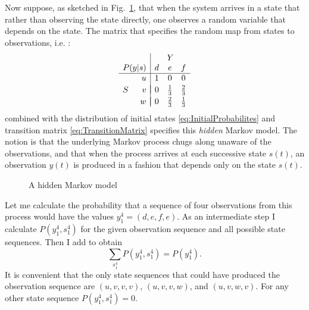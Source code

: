 \documentclass[]{article}
\newcommand{\ts}[3]{#1_{#2}^{#3}}                    %
\newcommand{\ti}[2]{{#1}{(#2)}}                  %
\newcommand{\ie}{i.e.\xspace}
\newcommand{\plotsize}{%
  \fontsize{9}{9}%
  \selectfont}
\renewcommand{\comment}[1]{}
\begin{document}
%
Now suppose, as sketched in Fig.~\ref{fig:dhmm}, that when the system
arrives in a state that rather than observing the state directly, one
observes a random variable that depends on the state.  The matrix that
specifies the random map from states to observations, \ie%
:
\begin{equation*}
  \begin{array}{cr|ccc}
      &      &\multicolumn{3}{c}{Y} \\
      \multicolumn{2}{r|}{P(y|s)} & d & e           & f \\ %
      \hline%
      & u      & 1 & 0           & 0 \\
      &        & \vspace{-1 em} \\
    S & v      & 0 & \frac{1}{3} & \frac{2}{3} \\
      &        & \vspace{-1 em} \\
      & w      & 0 & \frac{2}{3} & \frac{1}{3}
  \end{array}%
\end{equation*}
combined with the distribution of initial states
\eqref{eq:InitialProbabilites} and transition matrix
\eqref{eq:TransitionMatrix} specifies this \emph{hidden} Markov model.
The notion is that the underlying Markov process chugs along unaware
of the observations, and that when the process arrives at each
successive state $\ti{s}{t}$, an observation $\ti{y}{t}$ is produced
in a fashion that depends only on the state $\ti{s}{t}$.

\begin{figure}[htbp]
  \centering{\plotsize%
    
  }
  \caption[\comment{fig:Markov_dhmm }A hidden Markov model.]{A hidden Markov model}
  \label{fig:dhmm}
\end{figure}

Let me calculate the probability that a sequence of four observations
from this process would have the values $\ts{y}{1}{4} = (d,e,f,e)$.
As an intermediate step I calculate $P(\ts{y}{1}{4},\ts{s}{1}{4})$
for the given observation sequence and all possible state sequences.
Then I add to obtain
\begin{equation}
  \label{eq:dhmm_sum}
  \sum_{\ts{s}{1}{4}} P(\ts{y}{1}{4},\ts{s}{1}{4}) = P(\ts{y}{1}{4}).
\end{equation}
It is convenient that the only state sequences that could have
produced the observation sequence are $(u,v,v,v)$, $(u,v,v,w)$, and
$(u,v,w,v)$.  For any other state sequence
$P(\ts{y}{1}{4},\ts{s}{1}{4}) = 0$.
\end{document}
